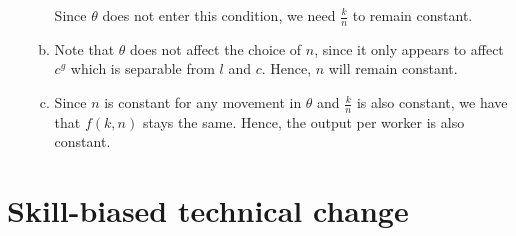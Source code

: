 \documentclass[12pt]{article}
\newcommand{\1}{{\bf 1}} %
\begin{document}
\begin{enumerate}[(1)]
\begin{enumerate}[(a)]
			Since $\theta$ does not enter this condition, we need $\frac{k}{n}$ to remain constant.
			\item 
			
			Note that $\theta$ does not affect the choice of $n$, since it only appears to affect $c^g$ which is separable from $l$ and $c$. Hence, $n$ will remain constant.
			\item 
			
			Since $n$ is constant for any movement in $\theta$ and  $\frac{k}{n}$ is also constant, we have that $f(k,n)$ stays the same. Hence, the output per worker is also constant.
			
		\end{enumerate}
\end{enumerate}


\section*{Skill-biased technical change}
\end{document}
